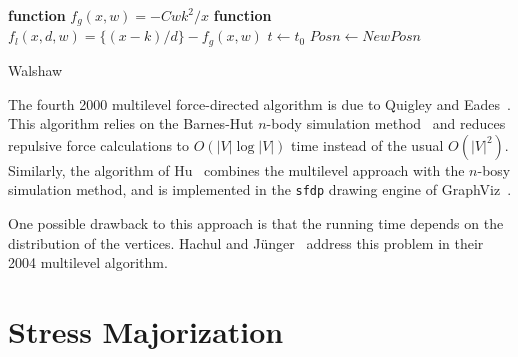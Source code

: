 \documentclass[notitlepage,letter,11pt]{article}
\begin{document}
\begin{algorithm}
{\bf function} $f_g(x,w)= -Cwk^2/x$ 
           {\bf function} $f_l(x,d,w)= \{(x-k)/d\} -f_g(x,w)$  
	   $t\gets t_0$	
	   $Posn \gets NewPosn$\;
\caption{Walshaw \label{alg:Wal}}
\end{algorithm}

The fourth 2000 multilevel force-directed algorithm is due to Quigley
and Eades~\cite{qe-fade-00}. This algorithm relies on the Barnes-Hut
$n$-body simulation method~\cite{Barnes86a} and reduces repulsive
force calculations to $O(|V| \log |V|)$ time instead of the usual
$O(|V|^2)$.  Similarly, the algorithm of Hu~\cite{Hu05} combines the multilevel
approach with the $n$-bosy simulation method, and is implemented in
the {\tt sfdp} drawing engine of GraphViz~\cite{graphviz}.

One possible drawback to this approach is that the running
time depends on the distribution of the vertices. Hachul and
J{\"u}nger~\cite{hj-dlg-04} address this problem in their 2004 multilevel
algorithm. 



\section{Stress Majorization}
\label{fd:sec:stress}
\end{document}
